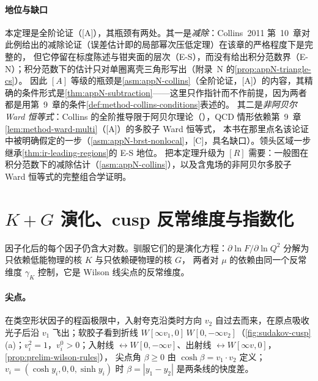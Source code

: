 \paragraph{地位与缺口}本定理是全阶论证（[A]），其瓶颈有两处。其一是\emph{减除}：Collins~2011 第~10~章对此例给出的减除论证（误差估计即\cite[第~10.7~节，式~(10.81)--(10.84)]{Collins2011}的局部幂次压低定理）在该章的严格程度下是完整的，
但它停留在标度陈述与钳夹面的层次（E-S），而没有给出积分范数界（E-N）；积分范数下的估计只对单圈离壳三角形写出（附录~N 的\cref{prop:appN-triangle-cs}）。
因此 $[A]$ 等级的瓶颈是\cref{asm:appN-collins}（全阶论证，[A]）的内容，其精确的条件形式是\cref{thm:appN-subtraction}——这里只作指针而不作前提，因为两者都是用第~9~章的条件\cref{def:method-collins-conditions}表述的。
其二是\emph{非阿贝尔 Ward 恒等式}：Collins 的全阶推导限于阿贝尔理论（\cite[第~10.8.3~节]{Collins2011}），QCD 情形依赖第~9~章\cref{lem:method-ward-multi}（[A]）的多胶子 Ward 恒等式，
本书在那里点名该论证中被明确假定的一步（\cref{asm:appN-brst-nonlocal}，[C]，具名缺口）。领头区域一步继承\cref{thm:ir-leading-regions}的 E-S 地位。
把本定理升级为 $[R]$ 需要：一般图在积分范数下的减除估计（\cref{asm:appN-collins}），以及含鬼场的非阿贝尔多胶子 Ward 恒等式的完整组合学证明。
\section{\texorpdfstring{$K+G$}{K+G} 演化、cusp 反常维度与指数化}\label{sec:sudakov-evolution}

因子化后的每个因子仍含大对数。驯服它们的是演化方程：$\partial\ln F/\partial\ln Q^2$ 分解为只依赖低能物理的核 $K$ 与只依赖硬物理的核 $G$，
两者对 $\mu$ 的依赖由同一个反常维度 $\gamma_K$ 控制，它是 Wilson 线尖点的反常维度。

\paragraph{尖点。}在类空形状因子的程函极限中，入射夸克沿类时方向 $v_2$ 自过去而来，在原点吸收光子后沿 $v_1$ 飞出；软胶子看到折线
$W[\infty v_1,0]\,W[0,-\infty v_2]$（\cref{fig:sudakov-cusp}(a)；$v_i^2=1$，$v_i^0>0$；入射线 $\leftrightarrow W[0,-\infty v]$、出射线 $\leftrightarrow W[\infty v,0]$，\cref{prop:prelim-wilson-rules}），
尖点角 $\beta\ge0$ 由 $\cosh\beta=v_1\cdot v_2$ 定义；$v_i=(\cosh y_i,0,0,\sinh y_i)$ 时 $\beta=|y_1-y_2|$ 是两条线的快度差。

